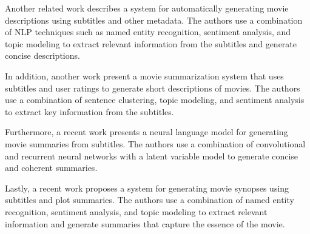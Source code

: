 \documentclass[fleqn,moreauthors,10pt]{ds_report}
\begin{document}
Another related work \cite{subramanian2017automatic} describes a system for automatically generating movie descriptions using subtitles and other metadata. The authors use a combination of NLP techniques such as named entity recognition, sentiment analysis, and topic modeling to extract relevant information from the subtitles and generate concise descriptions.

In addition, another work \cite{huang2020movie} present a movie summarization system that uses subtitles and user ratings to generate short descriptions of movies. The authors use a combination of sentence clustering, topic modeling, and sentiment analysis to extract key information from the subtitles.

Furthermore, a recent work \cite{chen2019generating} presents a neural language model for generating movie summaries from subtitles. The authors use a combination of convolutional and recurrent neural networks with a latent variable model to generate concise and coherent summaries.

Lastly, a recent work \cite{jhanwar2020movie} proposes a system for generating movie synopses using subtitles and plot summaries. The authors use a combination of named entity recognition, sentiment analysis, and topic modeling to extract relevant information and generate summaries that capture the essence of the movie.






 
\end{document}
